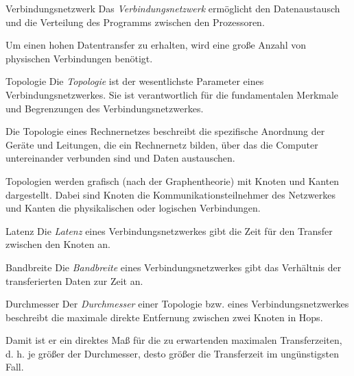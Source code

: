 \begin{defi}{Verbindungsnetzwerk}
    Das \emph{Verbindungsnetzwerk} ermöglicht den Datenaustausch und die Verteilung des Programms zwischen den Prozessoren.
    
    Um einen hohen Datentransfer zu erhalten, wird eine große Anzahl von physischen Verbindungen benötigt.
\end{defi}

\begin{defi}[Verbindungsnetzwerk]{Topologie}
    Die \emph{Topologie} ist der wesentlichste Parameter eines Verbindungsnetzwerkes.
    Sie ist verantwortlich für die fundamentalen Merkmale und Begrenzungen des Verbindungsnetzwerkes.
    
    Die Topologie eines Rechnernetzes beschreibt die spezifische Anordnung der Geräte und Leitungen, die ein Rechnernetz bilden, über das die Computer untereinander verbunden sind und Daten austauschen.
    
    Topologien werden grafisch (nach der Graphentheorie) mit Knoten und Kanten dargestellt.
    Dabei sind Knoten die Kommunikationsteilnehmer des Netzwerkes und Kanten die physikalischen oder logischen Verbindungen.
\end{defi}

\begin{defi}[Verbindungsnetzwerk]{Latenz}
    Die \emph{Latenz} eines Verbindungsnetzwerkes gibt die Zeit für den Transfer zwischen den Knoten an.
\end{defi}

\begin{defi}[Verbindungsnetzwerk]{Bandbreite}
    Die \emph{Bandbreite} eines Verbindungsnetzwerkes gibt das Verhältnis der transferierten Daten zur Zeit an.
\end{defi}

\begin{defi}[Verbindungsnetzwerk]{Durchmesser}
    Der \emph{Durchmesser} einer Topologie bzw. eines Verbindungsnetzwerkes beschreibt die maximale direkte Entfernung zwischen zwei Knoten in Hops.
    
    Damit ist er ein direktes Maß für die zu erwartenden maximalen Transferzeiten, d. h. je größer der Durchmesser, desto größer die Transferzeit im ungünstigsten Fall.
\end{defi}

